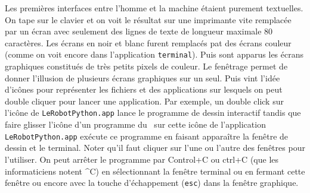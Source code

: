 {\begin{minipage}{\myparboxwidth}
Les premières interfaces entre l'homme et la machine étaient purement textuelles. On tape sur
le clavier et on voit le résultat sur une imprimante vite remplacée par un écran avec seulement
des lignes de texte de longueur maximale 80 caractères. Les écrans en noir et blanc furent
remplacés pat des écrans couleur (comme on voit encore dans l'application \texttt{terminal}).
Puis sont apparus les écrans graphiques constitués de très petits pixels de couleur. Le
fenêtrage permet de donner l'illusion de plusieurs écrans graphiques sur un seul. Puis vint
l'idée d'icônes pour représenter les fichiers et des applications sur lesquels on peut
double cliquer pour lancer une application. Par exemple,  un double click sur l'icône de
\texttt{LeRobotPython.app} lance le programme de dessin interactif tandis que faire glisser l'icône
d'un programme du \robot\ sur cette icône de l'application \texttt{LeRobotPython.app} exécute ce programme
en faisant apparaître la fenêtre de dessin et le terminal. Noter qu'il faut cliquer sur
l'une ou l'autre des fenêtres pour l'utiliser. On peut arrêter le programme par Control+C ou
ctrl+C (que les informaticiens notent \^{}C) en sélectionnant la fenêtre terminal ou en fermant cette fenêtre ou encore avec la touche  d'échappement (\texttt{esc}) dans la fenêtre graphique.

\end{minipage}
}

